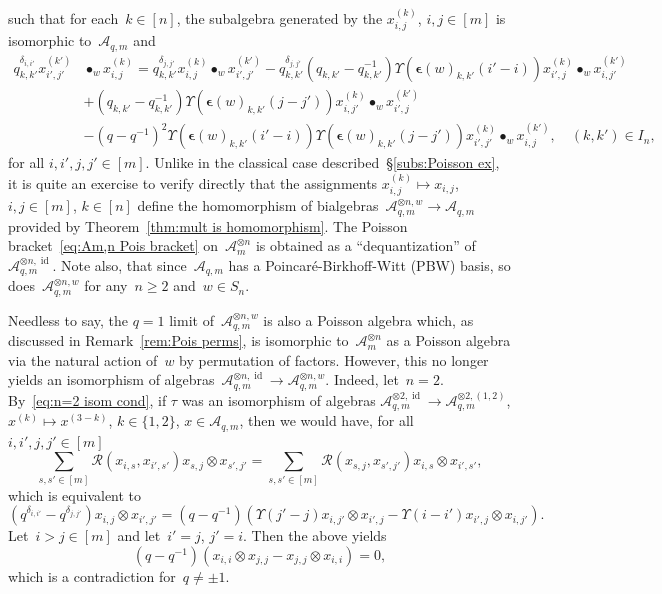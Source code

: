 \documentclass[12pt, reqno]{amsart}
\theoremstyle{definition}
\numberwithin{equation}{section}
\newcommand{\tensor}{\otimes}
\DeclareMathOperator{\id}{id}
\newcommand{\sgna}[1]{\boldsymbol{\epsilon}(#1)}
\begin{document}
such that for each~$k\in[n]$, the subalgebra
generated by the $x_{i,j}^{(k)}$, $i,j\in[m]$
is isomorphic to~$\mathcal A_{q,m}$ and
\begin{align*}
q_{k,k'}^{\delta_{i,i'}}x_{i',j'}^{(k')}&\bullet_w x_{i,j}^{(k)}
=q_{k,k'}^{\delta_{j,j'}}x_{i,j}^{(k)}\bullet_w x_{i',j'}^{(k')}
-q_{k,k'}^{\delta_{j,j'}}(q_{k,k'}-q_{k,k'}^{-1})\Upsilon(\sgna{w}_{k,k'}(i'-i))x_{i',j}^{(k)}\bullet_w x_{i,j'}^{(k')}
\\
&+(q_{k,k'}-q_{k,k'}^{-1})
\Upsilon(\sgna{w}_{k,k'}(j-j'))x_{i,j'}^{(k)}\bullet_w x_{i',j}^{(k')}\\
&
-(q-q^{-1})^2\Upsilon(\sgna{w}_{k,k'}(i'-i))\Upsilon(\sgna{w}_{k,k'}(j-j'))x_{i',j'}^{(k)}\bullet_w x_{i,j}^{(k')},\quad (k,k')\in I_n,
\end{align*}
for all $i,i',j,j'\in[m]$. Unlike in the classical case 
described~\S\ref{subs:Poisson ex}, it is quite an exercise to verify directly that the assignments $x_{i,j}^{(k)}\mapsto
x_{i,j}$, $i,j\in[m]$, $k\in[n]$ define the homomorphism 
of bialgebras~$\mathcal A_{q,m}^{\tensor n,w}\to 
\mathcal A_{q,m}$ provided by Theorem~\ref{thm:mult is homomorphism}. 
The Poisson bracket~\eqref{eq:Am,n Pois bracket} on~$\mathcal A_{m}^{\tensor n}$ 
is obtained
as a ``dequantization'' of~$\mathcal A_{q,m}^{\tensor n,\id}$. Note also, that 
since~$\mathcal A_{q,m}$ has a Poincar\'e-Birkhoff-Witt (PBW) basis, so does~$\mathcal A_{q,m}^{\tensor n,w}$
for any~$n\ge 2$ and~$w\in S_n$.

Needless to say, the $q=1$ limit of~$\mathcal A_{q,m}^{\tensor n,w}$ is also a Poisson algebra which, as discussed in Remark~\ref{rem:Pois perms}, is isomorphic to~$\mathcal A_{m}^{\tensor n}$ as a Poisson algebra via the natural action of~$w$ by permutation of factors. However, this no longer yields an isomorphism of algebras~$\mathcal A_{q,m}^{\tensor n,\id}\to 
\mathcal A_{q,m}^{\tensor n,w}$. Indeed, let~$n=2$. By~\eqref{eq:n=2 isom cond}, if
$\tau$ was an isomorphism of algebras 
$\mathcal A_{q,m}^{\tensor 2,\id}\to \mathcal A_{q,m}^{\tensor 2,(1,2)}$,
$x^{(k)}\mapsto x^{(3-k)}$, $k\in\{1,2\}$, $x\in \mathcal A_{q,m}$, then we would have, for all
$i,i',j,j'\in[m]$
$$
\sum_{s,s'\in[m]}\mathcal R(x_{i,s},x_{i',s'})x_{s,j}\tensor x_{s',j'}
=\sum_{s,s'\in[m]}\mathcal R(x_{s,j},x_{s',j'})x_{i,s}\tensor x_{i',s'},
$$
which is equivalent to
$$
(q^{\delta_{i,i'}}-q^{\delta_{j,j'}})x_{i,j}\tensor x_{i',j'}=(q-q^{-1})(\Upsilon(j'-j)x_{i,j'}\tensor x_{i',j}-\Upsilon(i-i')x_{i',j}\tensor x_{i,j'}).
$$
Let~$i>j\in[m]$ and let~$i'=j$, $j'=i$. Then
the above yields
$$
(q-q^{-1})(x_{i,i}\tensor x_{j,j}-x_{j,j}\tensor x_{i,i})=0,
$$
which is a contradiction for~$q\not=\pm1$.
\end{document}
